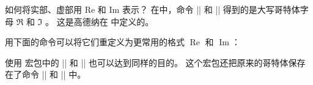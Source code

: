 \begin{myQA}{如何将实部、虚部用 Re 和 Im 表示？}
在\LaTeXTeX 中，命令 \code|\Re| 和 \code|\Im| 得到的是大写哥特体字母
$\Re$  和 $\Im$ 。
这是高德纳在  中定义的。

用下面的命令可以将它们重定义为更常用的格式 $\operatorname{Re}$
和 $\operatorname{Im}$：
\begin{myCode}
\renewcommand{\Re}{\operatorname{Re}}
\renewcommand{\Im}{\operatorname{Im}}
\end{myCode}

使用   宏包中的 \code|\Re| 和
\code|\Im| 也可以达到同样的目的。
这个宏包还把原来的哥特体保存在了命令 \code|\real| 和 \code|\imaginary| 中。
 

\end{myQA}

